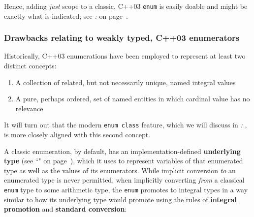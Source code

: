 \noindent Hence, adding \emph{just} scope to a classic, C++03 \texttt{enum} is
easily doable and might be exactly what is indicated; see
\textit{: } on page~\pageref{strong-typing-of-an-enum-class-can-be-counterproductive}.

\subsubsection[Drawbacks relating to weakly typed, C++03 enumerators]{Drawbacks relating to weakly typed, C++03 enumerators}\label{drawbacks-relating-to-weakly-typed,-c++03-enumerators}

Historically, C++03 enumerations have been employed to represent at
least two distinct concepts:

\begin{enumerate}
\item{A collection of related, but not necessarily unique, named integral values}
\item{A pure, perhaps ordered, set of named entities in which cardinal value has no relevance}
\end{enumerate}

\noindent It will turn out that the modern \texttt{enum}~\texttt{class} feature,
which we will discuss in \textit{: }, is more closely aligned with this second
concept.

A classic enumeration, by default, has an implementation-defined
\textbf{underlying type} (see ``" on page~\pageref{explicit-enumeration-underlying-type}), which it uses to represent
variables of that enumerated type as well as the values of its
enumerators. While implicit conversion \emph{to} an enumerated type is
never permitted, when implicitly converting \emph{from} a classical
\texttt{enum} type to some arithmetic type, the \texttt{enum} promotes
to integral types in a way similar to how its underlying type would
promote using the rules of \textbf{integral promotion} and
\textbf{standard conversion}:

